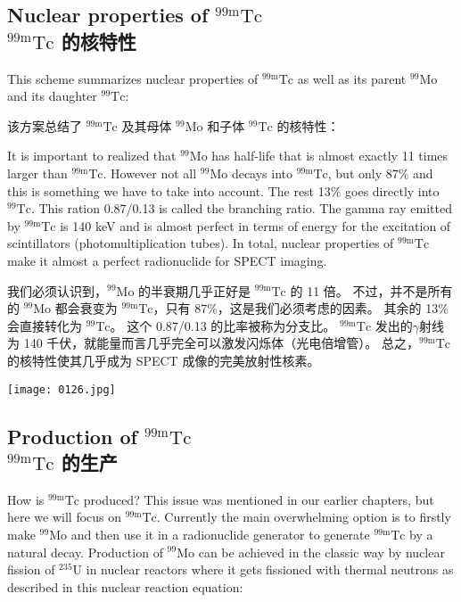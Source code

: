 \documentclass[dvipsnames, svgnames,a4paper,11pt]{article}
\begin{document}
\subsection{Nuclear properties of ${}^\mathrm{99m}\mathrm{Tc}$ \\${}^\mathrm{99m}\mathrm{Tc}$ 的核特性}

This scheme summarizes nuclear properties of ${}^\mathrm{99m}\mathrm{Tc}$ as well as its parent ${}^\mathrm{99}\mathrm{Mo}$ and
its daughter $\mathrm{{}^{99}Tc}$:

该方案总结了 ${}^\mathrm{99m}\mathrm{Tc}$ 及其母体 ${}^\mathrm{99}\mathrm{Mo}$ 和子体 $\mathrm{{}^{99}Tc}$ 的核特性：

It is important to realized that ${}^\mathrm{99}\mathrm{Mo}$ has half-life that is almost exactly 11 times larger
than ${}^\mathrm{99m}\mathrm{Tc}$. However not all ${}^\mathrm{99}\mathrm{Mo}$ decays into ${}^\mathrm{99m}\mathrm{Tc}$, but only 87\% and this is
something we have to take into account. The rest 13\% goes directly into $\mathrm{{}^{99}Tc}$. This
ration 0.87/0.13 is called the branching ratio. The gamma ray emitted by ${}^\mathrm{99m}\mathrm{Tc}$ is 140
keV and is almost perfect in terms of energy for the excitation of scintillators
(photomultiplication tubes). In total, nuclear properties of ${}^\mathrm{99m}\mathrm{Tc}$ make it almost a
perfect radionuclide for SPECT imaging.

我们必须认识到，${}^\mathrm{99}\mathrm{Mo}$ 的半衰期几乎正好是 ${}^\mathrm{99m}\mathrm{Tc}$ 的 11 倍。 不过，并不是所有的 ${}^\mathrm{99}\mathrm{Mo}$ 都会衰变为 ${}^\mathrm{99m}\mathrm{Tc}$，只有 87\%，这是我们必须考虑的因素。 其余的 13\% 会直接转化为 $\mathrm{{}^{99}Tc}$。 这个 0.87/0.13 的比率被称为分支比。 ${}^\mathrm{99m}\mathrm{Tc}$ 发出的$\gamma$射线为 140 千伏，就能量而言几乎完全可以激发闪烁体（光电倍增管）。 总之，${}^\mathrm{99m}\mathrm{Tc}$ 的核特性使其几乎成为 SPECT 成像的完美放射性核素。

\begin{figure*}[h]
	\centering
    \texttt{[image: 0126.jpg]}    
\end{figure*}

\subsection{Production of ${}^\mathrm{99m}\mathrm{Tc}$ \\${}^\mathrm{99m}\mathrm{Tc}$ 的生产}

How is ${}^\mathrm{99m}\mathrm{Tc}$ produced? This issue was mentioned in our earlier chapters, but here
we will focus on ${}^\mathrm{99m}\mathrm{Tc}$. Currently the main overwhelming option is to firstly make
${}^\mathrm{99}\mathrm{Mo}$ and then use it in a radionuclide generator to generate ${}^\mathrm{99m}\mathrm{Tc}$ by a natural decay.
Production of ${}^\mathrm{99}\mathrm{Mo}$ can be achieved in the classic way by nuclear fission of $\mathrm{{}^{235}U}$ in
nuclear reactors where it gets fissioned with thermal neutrons as described in this
nuclear reaction equation:
\end{document}
